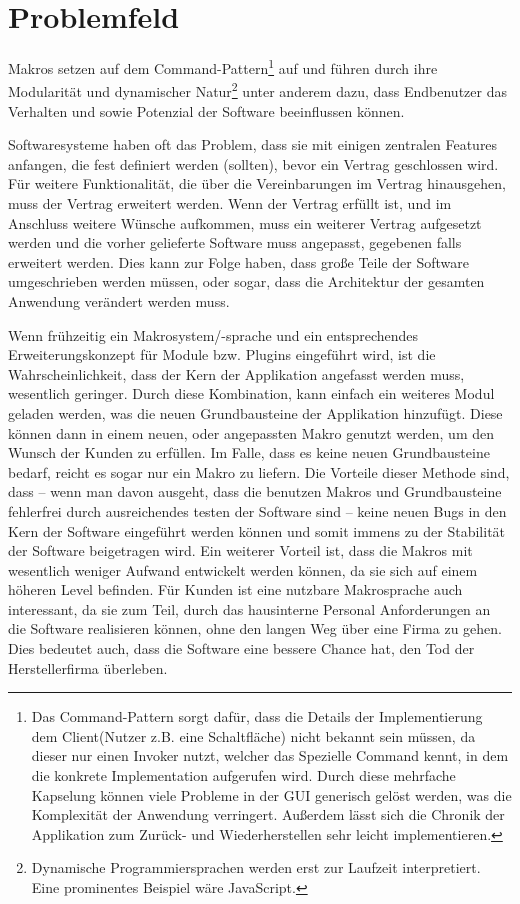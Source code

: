 \section{Problemfeld}
\label{sec:problemfeld}
  Makros setzen auf dem Command-Pattern\footnote{
    Das Command-Pattern sorgt dafür, dass die Details der Implementierung dem Client(Nutzer z.B. eine Schaltfläche) nicht bekannt sein müssen, da dieser nur einen Invoker nutzt, welcher das Spezielle Command kennt, in dem die konkrete Implementation aufgerufen wird. Durch diese mehrfache Kapselung können viele Probleme in der GUI generisch gelöst werden, was die Komplexität der Anwendung verringert. Außerdem lässt sich die Chronik der Applikation zum Zurück- und Wiederherstellen sehr leicht implementieren.
  } auf und führen durch ihre Modularität und dynamischer Natur\footnote{
    Dynamische Programmiersprachen werden erst zur Laufzeit interpretiert. Eine prominentes Beispiel wäre JavaScript.
  } unter anderem dazu, dass Endbenutzer das Verhalten und sowie Potenzial der Software beeinflussen können.

  Softwaresysteme haben oft das Problem, dass sie mit einigen zentralen Features anfangen, die fest definiert werden (sollten), bevor ein Vertrag geschlossen wird. Für weitere Funktionalität, die über die Vereinbarungen im Vertrag hinausgehen, muss der Vertrag erweitert werden. Wenn der Vertrag erfüllt ist, und im Anschluss weitere Wünsche aufkommen, muss ein weiterer Vertrag aufgesetzt werden und die vorher gelieferte Software muss angepasst, gegebenen falls erweitert werden. Dies kann zur Folge haben, dass große Teile der Software umgeschrieben werden müssen, oder sogar, dass die Architektur der gesamten Anwendung verändert werden muss.

  Wenn frühzeitig ein Makrosystem/-sprache und ein entsprechendes Erweiterungskonzept für Module bzw. Plugins eingeführt wird, ist die Wahrscheinlichkeit, dass der Kern der Applikation angefasst werden muss, wesentlich geringer. Durch diese Kombination, kann einfach ein weiteres Modul geladen werden, was die neuen Grundbausteine der Applikation hinzufügt. Diese können dann in einem neuen, oder angepassten Makro genutzt werden, um den Wunsch der Kunden zu erfüllen. Im Falle, dass es keine neuen Grundbausteine bedarf, reicht es sogar nur ein Makro zu liefern. Die Vorteile dieser Methode sind, dass -- wenn man davon ausgeht, dass die benutzen Makros und Grundbausteine fehlerfrei durch ausreichendes testen der Software sind -- keine neuen Bugs in den Kern der Software eingeführt werden können und somit immens zu der Stabilität der Software beigetragen wird. Ein weiterer Vorteil ist, dass die Makros mit wesentlich weniger Aufwand entwickelt werden können, da sie sich auf einem höheren Level befinden. Für Kunden ist eine nutzbare Makrosprache auch interessant, da sie zum Teil, durch das hausinterne Personal Anforderungen an die Software realisieren können, ohne den langen Weg über eine Firma zu gehen. Dies bedeutet auch, dass die Software eine bessere Chance hat, den Tod der Herstellerfirma überleben.

